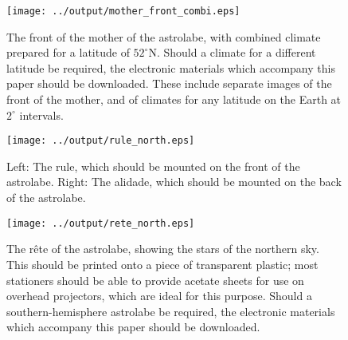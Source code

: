 \documentclass[a4paper,onecolumn,10pt]{article}
\begin{document}
\begin{figure}
\centerline{\texttt{[image: ../output/mother\_front\_combi.eps]}}
\caption{The front of the mother of the astrolabe, with combined climate prepared for a latitude of $52^\circ$N. Should a climate for a different latitude be required, the electronic materials which accompany this paper should be downloaded. These include separate images of the front of the mother, and of climates for any latitude on the Earth at $2^\circ$ intervals.}
\label{mother_front}
\end{figure}

\begin{figure}
\centerline{\texttt{[image: ../output/rule\_north.eps]}}
\caption{Left: The rule, which should be mounted on the front of the astrolabe. Right: The alidade, which should be mounted on the back of the astrolabe.}
\label{rule}
\end{figure}

\begin{figure}
\centerline{\texttt{[image: ../output/rete\_north.eps]}}
\caption{The r\^ete of the astrolabe, showing the stars of the northern sky. This should be printed onto a piece of transparent plastic; most stationers should be able to provide acetate sheets for use on overhead projectors, which are ideal for this purpose. Should a southern-hemisphere astrolabe be required, the electronic materials which accompany this paper should be downloaded.}
\label{rete}
\end{figure}
\end{document}
